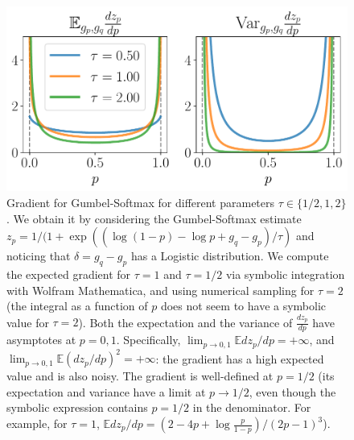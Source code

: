\documentclass[a4paper,11pt,oneside]{report}
\begin{document}
\begin{figure}[h]
    \centering
    \includegraphics[width=0.8\linewidth]{plots/plot_gumbel_gradient.pdf}
    \caption{Gradient for Gumbel-Softmax for different parameters $\tau\in\{1/2,1,2\}$. We obtain it by considering the Gumbel-Softmax estimate $z_p=1/(1+\exp((\log(1-p)-\log p+g_q-g_p)/\tau)$ and noticing that $\delta=g_q-g_p$ has a Logistic distribution. We compute the expected gradient for $\tau=1$ and $\tau=1/2$ via symbolic integration with Wolfram Mathematica, and using numerical sampling for $\tau=2$ (the integral as a function of $p$ does not seem to have a symbolic value for $\tau=2$). Both the expectation and the variance of $\frac{dz_p}{dp}$ have asymptotes at $p=0,1$. Specifically, $\lim_{p\to 0,1}\mathbb E dz_p/dp=+\infty$, and $\lim_{p\to 0,1}\mathbb E \left(dz_p/dp\right)^2=+\infty$: the gradient has a high expected value and is also noisy. The gradient is well-defined at $p=1/2$ (its expectation and variance have a limit at $p\to 1/2$, even though the symbolic expression contains $p=1/2$ in the denominator. For example, for $\tau=1$, $\mathbb E dz_p/dp=(2-4p+\log\frac{p}{1-p})/(2p-1)^3$).}
    \label{fig:gumbel_gradient}
\end{figure}
\end{document}
